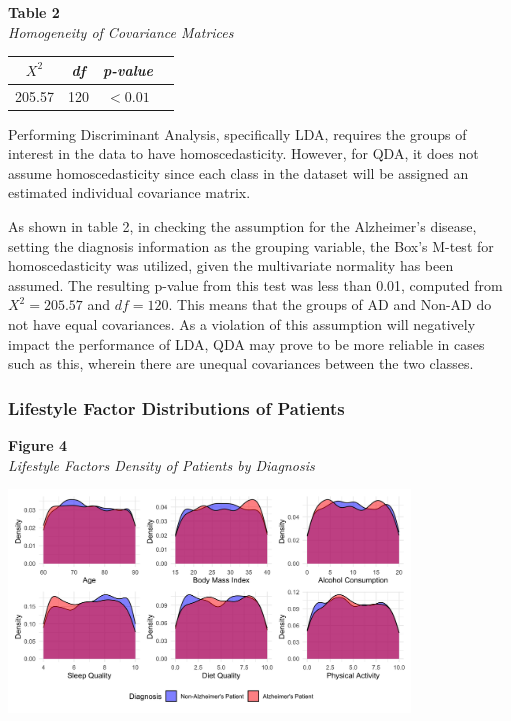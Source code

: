 \documentclass[12pt]{article}
\begin{document}
\noindent
\textbf{Table 2}\\
\textit{Homogeneity of Covariance Matrices}
\begin{center}
    \begin{tabular}{cccc}
        \hline
        \textit{$X^2$} & \textit{df} & \textit{p-value} \\
        \hline
        205.57 & 120 &  $ < 0.01$ \\
        \hline
    \end{tabular}
\end{center}

Performing Discriminant Analysis, specifically LDA, requires the groups of interest in the data to have homoscedasticity. However, for QDA, it does 
not assume homoscedasticity since each class in the dataset will be assigned an estimated individual covariance matrix. 

As shown in table 2, in checking the assumption for the Alzheimer's disease, setting the diagnosis information as the grouping variable, the Box's M-test
for homoscedasticity was utilized, given the multivariate normality has been assumed. The resulting p-value from this test was less than 0.01, computed from 
$X^{2} = 205.57$ and $df = 120$. This means that the groups of AD and Non-AD do not have equal covariances. As a violation of this assumption will negatively impact 
the performance of LDA, QDA may prove to be more reliable in cases such as this, wherein there are unequal covariances between the two classes.  

\subsubsection{Lifestyle Factor Distributions of Patients}
\noindent
\textbf{Figure 4}\\
\textit{Lifestyle Factors Density of Patients by Diagnosis}
\begin{center}
    \includegraphics[width = 0.8\textwidth]{Lifestyle Distributions.png}
\end{center}
\end{document}
